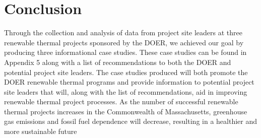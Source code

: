 \section{Conclusion}
\par Through the collection and analysis of data from project site leaders at three renewable thermal projects sponsored by the DOER, we achieved our goal  \goal by producing three informational case studies. These case studies can be found in Appendix 5 along with a list of recommendations to both the DOER and potential project site leaders. The case studies produced will both promote the DOER renewable thermal programs and provide information to potential project site leaders that will, along with the list of recommendations, aid in improving renewable thermal project processes. As the number of successful renewable thermal projects increases in the Commonwealth of Massachusetts, greenhouse gas emissions and fossil fuel dependence will decrease, resulting in a healthier and more sustainable future